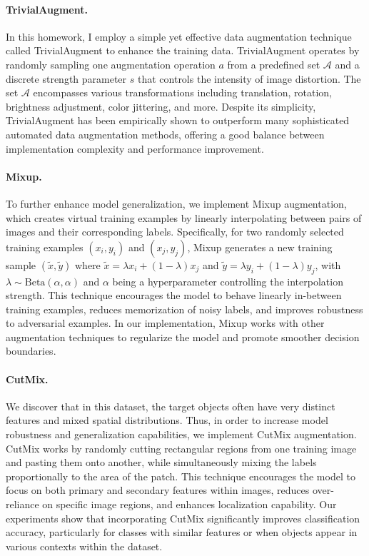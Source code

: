 \documentclass[twocolumn,a4paper]{article}
\begin{document}
\paragraph{TrivialAugment\cite{muller2021trivialaugment}.} In this homework, I employ a simple yet effective data augmentation technique called TrivialAugment\cite{muller2021trivialaugment} to enhance the training data. TrivialAugment operates by randomly sampling one augmentation operation $a$ from a predefined set $\mathcal{A}$ and a discrete strength parameter $s$ that controls the intensity of image distortion. The set $\mathcal{A}$ encompasses various transformations including translation, rotation, brightness adjustment, color jittering, and more. Despite its simplicity, TrivialAugment has been empirically shown to outperform many sophisticated automated data augmentation methods, offering a good balance between implementation complexity and performance improvement.

\paragraph{Mixup\cite{zhang2017mixup}.} To further enhance model generalization, we implement Mixup\cite{zhang2017mixup} augmentation, which creates virtual training examples by linearly interpolating between pairs of images and their corresponding labels. Specifically, for two randomly selected training examples $(x_i, y_i)$ and $(x_j, y_j)$, Mixup generates a new training sample $(\tilde{x}, \tilde{y})$ where $\tilde{x} = \lambda x_i + (1-\lambda) x_j$ and $\tilde{y} = \lambda y_i + (1-\lambda) y_j$, with $\lambda \sim \text{Beta}(\alpha, \alpha)$ and $\alpha$ being a hyperparameter controlling the interpolation strength. This technique encourages the model to behave linearly in-between training examples, reduces memorization of noisy labels, and improves robustness to adversarial examples. In our implementation, Mixup works with other augmentation techniques to regularize the model and promote smoother decision boundaries.

\paragraph{CutMix\cite{yun2019cutmix}.} We discover that in this dataset, the target objects often have very distinct features and mixed spatial distributions. Thus, in order to increase model robustness and generalization capabilities, we implement CutMix\cite{yun2019cutmix} augmentation. CutMix works by randomly cutting rectangular regions from one training image and pasting them onto another, while simultaneously mixing the labels proportionally to the area of the patch. This technique encourages the model to focus on both primary and secondary features within images, reduces over-reliance on specific image regions, and enhances localization capability. Our experiments show that incorporating CutMix significantly improves classification accuracy, particularly for classes with similar features or when objects appear in various contexts within the dataset.
\end{document}
